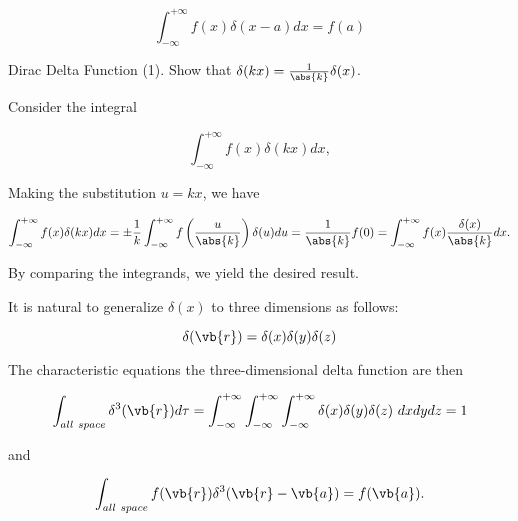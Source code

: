 \documentclass[english,a4paper,12pt]{report}
\begin{document}
\begin{equation} 
	\int_{-\infty}^{+\infty} f(x) \delta(x-a) dx = f(a) 
\end{equation}
	
\example
{Dirac Delta Function (1).}
{Show that \(\delta(kx) = \frac{1}{\abs{k}}\delta(x)\).}
{Consider the integral
			
\begin{equation} 
	\int_{-\infty}^{+\infty} f(x) \delta(kx) dx, 
\end{equation}

Making the substitution \(u=kx\), we have
			
\begin{equation} 
	\int_{-\infty}^{+\infty} f(x) \delta(kx) dx = \pm \frac{1}{k} \int_{-\infty}^{+\infty} f\left(\frac{u}{\abs{k}}\right) \delta(u) du = \frac{1}{\abs{k}} f(0) = \int_{-\infty}^{+\infty} f(x) \frac{\delta(x)}{\abs{k}} dx.
\end{equation}
			
By comparing the integrands, we yield the desired result.}	
		

	
It is natural to generalize \(\delta(x)\) to three dimensions as follows:
	
\begin{equation} 
	\delta(\vb{r}) = \delta(x)\delta(y)\delta(z) 
\end{equation}
	
The characteristic equations the three-dimensional delta function are then 
	

\begin{equation} 
	\int_{all~space} \delta^3(\vb{r})
	d\tau = \int_{-\infty}^{+\infty}\int_{-\infty}^{+\infty}\int_{-\infty}^{+\infty} \delta(x)\delta(y)\delta(z) ~dxdydz = 1 
\end{equation}
	
and
	
\begin{equation} 
	\int_{all~space} f(\vb{r}) \delta^3(\vb{r} - \vb{a}) = f(\vb{a}). 
\end{equation} 
	
\end{document}
